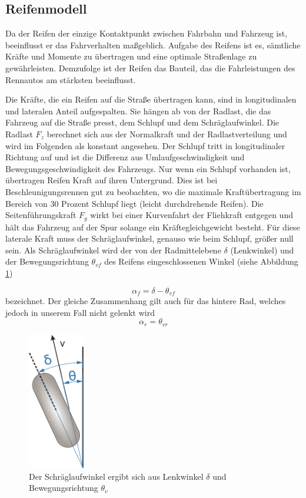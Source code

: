 \documentclass{like}
\begin{document}
\subsection{Reifenmodell}
\label{tireModel}
Da der Reifen der einzige Kontaktpunkt zwischen Fahrbahn und Fahrzeug ist, beeinflusst er das Fahrverhalten maßgeblich. Aufgabe des Reifens ist es, sämtliche Kräfte und Momente zu übertragen und eine optimale Straßenlage zu gewährleisten. Demzufolge ist der Reifen das Bauteil, das die Fahrleistungen des Rennautos am stärksten beeinflusst.

Die Kräfte, die ein Reifen auf die Straße übertragen kann, sind in longitudinalen und lateralen Anteil aufgespalten. Sie hängen ab von der Radlast, die das Fahrzeug auf die Straße presst, dem Schlupf und dem Schräglaufwinkel. Die Radlast \(F_z\) berechnet sich aus der Normalkraft und der Radlastverteilung und wird im Folgenden als konstant angesehen. Der Schlupf tritt in longitudinaler Richtung auf und ist die Differenz aus Umlaufgeschwindigkeit und Bewegungsgeschwindigkeit des Fahrzeugs.
Nur wenn ein Schlupf vorhanden ist, übertragen Reifen Kraft auf ihren Untergrund. Dies ist bei Be\-schleu\-ni\-gungs\-rennen gut zu beobachten, wo die maximale Kraftübertragung im Bereich von 30 Prozent Schlupf liegt (leicht durchdrehende Reifen).
Die Seitenführungskraft \(F_y\) wirkt bei einer Kurvenfahrt der Fliehkraft entgegen und hält das Fahrzeug auf der Spur solange ein Kräftegleichgewicht besteht. Für diese laterale Kraft muss der Schräglaufwinkel, genauso wie beim Schlupf, größer null sein. Als Schräglaufwinkel wird der von der Radmittelebene \(\delta\) (Lenkwinkel) und der Bewegungsrichtung \(\theta_{vf}\) des Reifens eingeschlossenen Winkel (siehe Abbildung \ref{fig:linLat})

\begin{equation}
\alpha_f = \delta - \theta_{vf}
\end{equation}
bezeichnet. Der gleiche Zusammenhang gilt auch für das hintere Rad, welches jedoch in unserem Fall nicht gelenkt wird
\begin{equation}
\alpha_r = \theta_{vr}
\end{equation}


\begin{figure}[ht!]
	\centering
	\includegraphics[width=70pt]{Abbildungen/slipAngle.png}
	\caption{Der Schräglaufwinkel ergibt sich aus Lenkwinkel \(\delta\) und Bewegungsrichtung \(\theta_{v}\)}
	\label{fig:linLat}
\end{figure}
\end{document}
